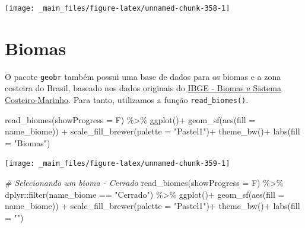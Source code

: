 \documentclass[
  brazilian,
]{book}
\newenvironment{Shaded}{\begin{snugshade}}{\end{snugshade}}
\newcommand{\AttributeTok}[1]{\textcolor[rgb]{0.77,0.63,0.00}{#1}}
\newcommand{\CommentTok}[1]{\textcolor[rgb]{0.56,0.35,0.01}{\textit{#1}}}
\newcommand{\FunctionTok}[1]{\textcolor[rgb]{0.00,0.00,0.00}{#1}}
\newcommand{\NormalTok}[1]{#1}
\newcommand{\SpecialCharTok}[1]{\textcolor[rgb]{0.00,0.00,0.00}{#1}}
\newcommand{\StringTok}[1]{\textcolor[rgb]{0.31,0.60,0.02}{#1}}
\begin{document}
\begin{center}\texttt{[image: \_main\_files/figure-latex/unnamed-chunk-358-1]} \end{center}

\hypertarget{biomas}{%
\section{Biomas}\label{biomas}}

O pacote \texttt{geobr} também possui uma base de dados para os biomas e a zona costeira do Brasil, baseado nos dados originais do \href{https://www.ibge.gov.br/apps/biomas/\#/home}{IBGE - Biomas e Sistema Costeiro-Marinho}. Para tanto, utilizamos a função \texttt{read\_biomes()}.

\begin{Shaded}
\begin{Highlighting}[]
\FunctionTok{read\_biomes}\NormalTok{(}\AttributeTok{showProgress =}\NormalTok{ F) }\SpecialCharTok{\%\textgreater{}\%} 
  \FunctionTok{ggplot}\NormalTok{()}\SpecialCharTok{+}
  \FunctionTok{geom\_sf}\NormalTok{(}\FunctionTok{aes}\NormalTok{(}\AttributeTok{fill =}\NormalTok{ name\_biome)) }\SpecialCharTok{+}
  \FunctionTok{scale\_fill\_brewer}\NormalTok{(}\AttributeTok{palette =} \StringTok{"Pastel1"}\NormalTok{)}\SpecialCharTok{+}
  \FunctionTok{theme\_bw}\NormalTok{()}\SpecialCharTok{+}
  \FunctionTok{labs}\NormalTok{(}\AttributeTok{fill =} \StringTok{"Biomas"}\NormalTok{)}
\end{Highlighting}
\end{Shaded}

\begin{center}\texttt{[image: \_main\_files/figure-latex/unnamed-chunk-359-1]} \end{center}

\begin{Shaded}
\begin{Highlighting}[]
\CommentTok{\# Selecionando um bioma {-} Cerrado}
\FunctionTok{read\_biomes}\NormalTok{(}\AttributeTok{showProgress =}\NormalTok{ F) }\SpecialCharTok{\%\textgreater{}\%} 
\NormalTok{  dplyr}\SpecialCharTok{::}\FunctionTok{filter}\NormalTok{(name\_biome }\SpecialCharTok{==} \StringTok{"Cerrado"}\NormalTok{) }\SpecialCharTok{\%\textgreater{}\%} 
  \FunctionTok{ggplot}\NormalTok{()}\SpecialCharTok{+}
  \FunctionTok{geom\_sf}\NormalTok{(}\FunctionTok{aes}\NormalTok{(}\AttributeTok{fill =}\NormalTok{ name\_biome)) }\SpecialCharTok{+}
  \FunctionTok{scale\_fill\_brewer}\NormalTok{(}\AttributeTok{palette =} \StringTok{"Pastel1"}\NormalTok{)}\SpecialCharTok{+}
  \FunctionTok{theme\_bw}\NormalTok{()}\SpecialCharTok{+}
  \FunctionTok{labs}\NormalTok{(}\AttributeTok{fill =} \StringTok{""}\NormalTok{)}
\end{Highlighting}
\end{Shaded}
\end{document}
